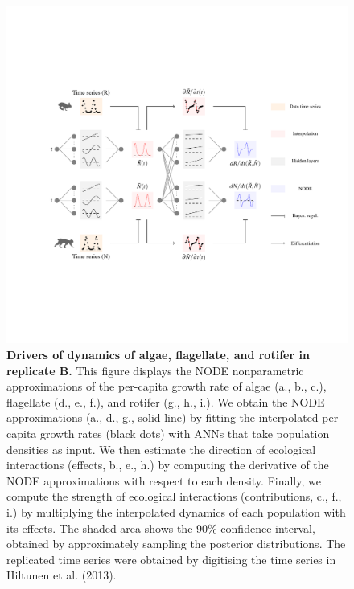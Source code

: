 \documentclass[11pt, oneside]{article}
\begin{document}
\newpage
\begin{figure}[H]
\begin{center}
\includegraphics[width=\linewidth,page=5]{figures/main.pdf}
\caption{
    \textbf{Drivers of dynamics of algae, flagellate, and rotifer in replicate B.}
    This figure displays the NODE nonparametric approximations of the per-capita growth rate of algae (a., b., c.), flagellate (d., e., f.), and rotifer (g., h., i.).
    We obtain the NODE approximations (a., d., g., solid line) by fitting the interpolated per-capita growth rates (black dots) with ANNs that take population densities as input.
    We then estimate the direction of ecological interactions (effects, b., e., h.) by computing the derivative of the NODE approximations with respect to each density.
    Finally, we compute the strength of ecological interactions (contributions, c., f., i.) by multiplying the interpolated dynamics of each population with its effects.
    The shaded area shows the 90\% confidence interval, obtained by approximately sampling the posterior distributions. 
    The replicated time series were obtained by digitising the time series in Hiltunen et al. (2013).
}
\end{center}
\end{figure}
\newpage
\end{document}
